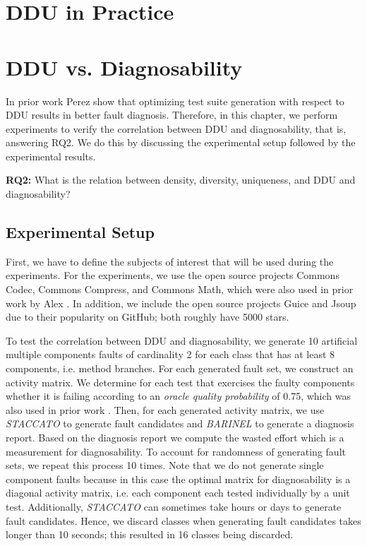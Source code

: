 \documentclass[twoside,a4paper,11pt]{memoir}
\begin{document}
\chapter{DDU in Practice}
\label{ch:rq1}


\chapter{DDU vs. Diagnosability}
\label{ch:rq2}
In prior work Perez \etal \cite{DBLP:conf/icse/PerezAD17} show that optimizing test suite generation with respect to DDU results in better fault diagnosis.
Therefore, in this chapter, we perform experiments to verify the correlation between DDU and diagnosability, that is, answering RQ2.
We do this by discussing the experimental setup followed by the experimental results.

\begin{framed}
\noindent
\textbf{RQ2:} What is the relation between density, diversity, uniqueness, and DDU and diagnosability?
\end{framed}


\section{Experimental Setup}
\label{sec:rq2_experimental_setup}
First, we have to define the subjects of interest that will be used during the experiments.
For the experiments, we use the open source projects Commons Codec, Commons Compress, and Commons Math, which were also used in prior work by Alex \etal \cite{DBLP:conf/icse/PerezAD17}.
In addition, we include the open source projects Guice and Jsoup due to their popularity on GitHub; both roughly have 5000 stars.

To test the correlation between DDU and diagnosability, we generate 10 artificial multiple components faults of cardinality 2 for each class that has at least 8 components, i.e. method branches.
For each generated fault set, we construct an activity matrix.
We determine for each test that exercises the faulty components whether it is failing according to an \emph{oracle quality probability} of 0.75, which was also used in prior work \cite{DBLP:conf/icse/PerezAD17}.
Then, for each generated activity matrix, we use \emph{STACCATO} to generate fault candidates and \emph{BARINEL} to generate a diagnosis report.
Based on the diagnosis report we compute the wasted effort which is a measurement for diagnosability.
To account for randomness of generating fault sets, we repeat this process 10 times.
Note that we do not generate single component faults because in this case the optimal matrix for diagnosability is a diagonal activity matrix, i.e. each component each tested individually by a unit test.
Additionally, \emph{STACCATO} can sometimes take hours or days to generate fault candidates.
Hence, we discard classes when generating fault candidates takes longer than 10 seconds; this resulted in 16 classes being discarded.
\end{document}
